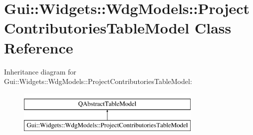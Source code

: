 \hypertarget{classGui_1_1Widgets_1_1WdgModels_1_1ProjectContributoriesTableModel}{\section{Gui\-:\-:Widgets\-:\-:Wdg\-Models\-:\-:Project\-Contributories\-Table\-Model Class Reference}
\label{classGui_1_1Widgets_1_1WdgModels_1_1ProjectContributoriesTableModel}
}
Inheritance diagram for Gui\-:\-:Widgets\-:\-:Wdg\-Models\-:\-:Project\-Contributories\-Table\-Model\-:\begin{figure}[H]
\begin{center}
\leavevmode
\includegraphics[height=2.000000cm]{d9/d71/classGui_1_1Widgets_1_1WdgModels_1_1ProjectContributoriesTableModel}
\end{center}
\end{figure}
